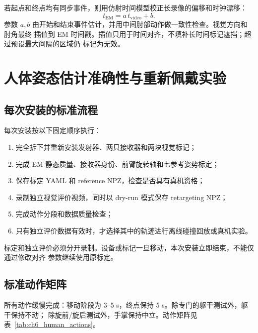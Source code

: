 若起点和终点均有同步事件，则用仿射时间模型校正长录像的偏移和时钟漂移：
\begin{equation}
  t_{\mathrm{EM}}=a\,t_{\mathrm{video}}+b.
  \label{eq:ch6_affine_time_alignment}
\end{equation}
参数 $a,b$ 由开始和结束事件估计，并用中间肘部动作做一致性检查。视觉方向和肘角最终
插值到 EM 时间戳。插值只用于时间对齐，不填补长时间标记遮挡；超过预设最大间隔的区域仍
标记为无效。

\section{人体姿态估计准确性与重新佩戴实验}
\label{sec:ch6_human_estimation_experiment}

\subsection{每次安装的标准流程}
\label{subsec:ch6_installation_protocol}

每次安装按以下固定顺序执行：
\begin{enumerate}[label=\arabic*)]
  \item 完全拆下并重新安装发射器、两只接收器和两块视觉标记；
  \item 完成 EM 静态质量、接收器身份、前臂旋转轴和七参考姿势标定；
  \item 保存标定 YAML 和 reference NPZ，检查是否具有真机资格；
  \item 录制独立视觉评价视频，同时以 dry-run 模式保存 retargeting NPZ；
  \item 完成动作分段和数据质量检查；
  \item 只有独立评价数据有效时，才选择其中的轨迹进行离线碰撞回放或真机实验。
\end{enumerate}

标定和独立评价必须分开录制。设备或标记一旦移动，本次安装立即结束，不能仅通过修改对齐
参数继续使用原标定。

\subsection{标准动作矩阵}
\label{subsec:ch6_human_action_matrix}

所有动作缓慢完成：移动阶段为 3--5 s，终点保持 5 s。除专门的躯干测试外，躯干保持不动；
除旋前/旋后测试外，手掌保持中立。动作矩阵见表~\ref{tab:ch6_human_actions}。

